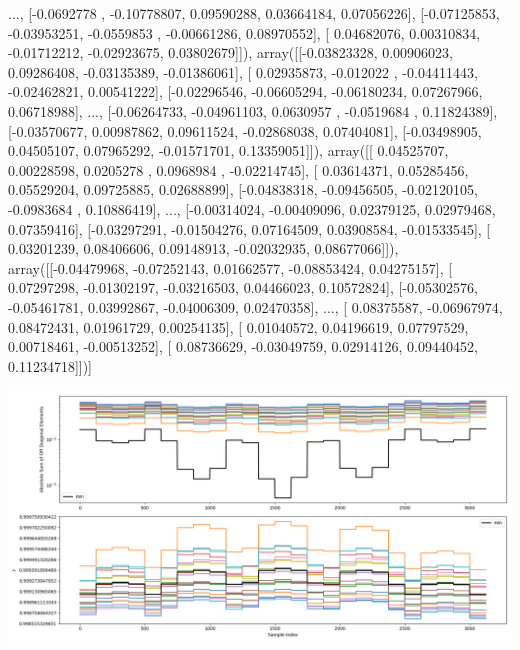 \documentclass{article}
\begin{document}
       ..., 
       [-0.0692778 , -0.10778807,  0.09590288,  0.03664184,  0.07056226],
       [-0.07125853, -0.03953251, -0.0559853 , -0.00661286,  0.08970552],
       [ 0.04682076,  0.00310834, -0.01712212, -0.02923675,  0.03802679]]), array([[-0.03823328,  0.00906023,  0.09286408, -0.03135389, -0.01386061],
       [ 0.02935873, -0.012022  , -0.04411443, -0.02462821,  0.00541222],
       [-0.02296546, -0.06605294, -0.06180234,  0.07267966,  0.06718988],
       ..., 
       [-0.06264733, -0.04961103,  0.0630957 , -0.0519684 ,  0.11824389],
       [-0.03570677,  0.00987862,  0.09611524, -0.02868038,  0.07404081],
       [-0.03498905,  0.04505107,  0.07965292, -0.01571701,  0.13359051]]), array([[ 0.04525707,  0.00228598,  0.0205278 ,  0.0968984 , -0.02214745],
       [ 0.03614371,  0.05285456,  0.05529204,  0.09725885,  0.02688899],
       [-0.04838318, -0.09456505, -0.02120105, -0.0983684 ,  0.10886419],
       ..., 
       [-0.00314024, -0.00409096,  0.02379125,  0.02979468,  0.07359416],
       [-0.03297291, -0.01504276,  0.07164509,  0.03908584, -0.01533545],
       [ 0.03201239,  0.08406606,  0.09148913, -0.02032935,  0.08677066]]), array([[-0.04479968, -0.07252143,  0.01662577, -0.08853424,  0.04275157],
       [ 0.07297298, -0.01302197, -0.03216503,  0.04466023,  0.10572824],
       [-0.05302576, -0.05461781,  0.03992867, -0.04006309,  0.02470358],
       ..., 
       [ 0.08375587, -0.06967974,  0.08472431,  0.01961729,  0.00254135],
       [ 0.01040572,  0.04196619,  0.07797529,  0.00718461, -0.00513252],
       [ 0.08736629, -0.03049759,  0.02914126,  0.09440452,  0.11234718]])]
\begin{center}
\includegraphics[scale=.9]{report_pickled_controls261/control_dpn_all.png}

\end{center}
\end{document}
